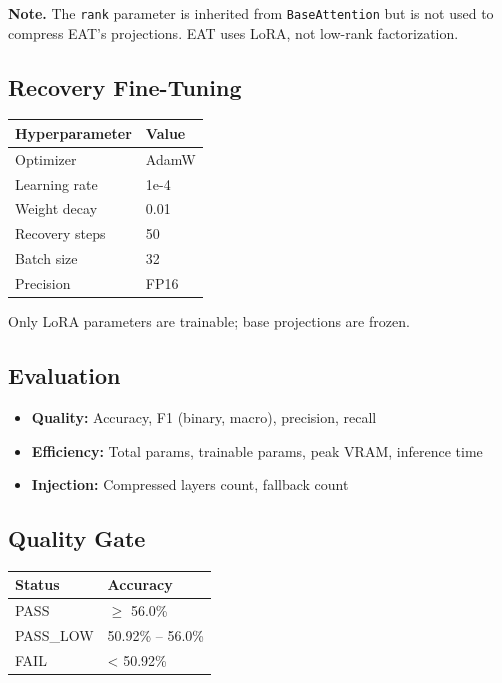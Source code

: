 \textbf{Note.} The \texttt{rank} parameter is inherited from \texttt{BaseAttention} but is not 
used to compress EAT's projections. EAT uses LoRA, not low-rank factorization.

\subsection{Recovery Fine-Tuning}

\begin{table}[H]
\centering
\small
\begin{tabular}{ll}
\toprule
\textbf{Hyperparameter} & \textbf{Value} \\
\midrule
Optimizer & AdamW \\
Learning rate & 1e-4 \\
Weight decay & 0.01 \\
Recovery steps & 50 \\
Batch size & 32 \\
Precision & FP16 \\
\bottomrule
\end{tabular}
\end{table}

Only LoRA parameters are trainable; base projections are frozen.

\subsection{Evaluation}

\begin{itemize}
\item \textbf{Quality:} Accuracy, F1 (binary, macro), precision, recall
\item \textbf{Efficiency:} Total params, trainable params, peak VRAM, inference time
\item \textbf{Injection:} Compressed layers count, fallback count

\end{itemize}
\subsection{Quality Gate}

\begin{table}[H]
\centering
\small
\begin{tabular}{ll}
\toprule
\textbf{Status} & \textbf{Accuracy} \\
\midrule
PASS & $\ge$ 56.0\% \\
PASS\_LOW & 50.92\% -- 56.0\% \\
FAIL & \textless{} 50.92\% \\
\bottomrule
\end{tabular}
\end{table}

